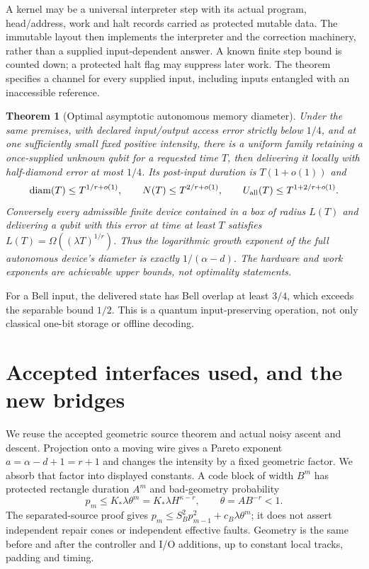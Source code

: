 \documentclass[11pt]{article}
\newtheorem{theorem}{Theorem}
\newcommand{\diam}{\operatorname{diam}}
\begin{document}
A kernel may be a universal interpreter step with its actual program,
head/address, work and halt records carried as protected mutable data.
The immutable layout then implements the interpreter and the correction
machinery, rather than a supplied input-dependent answer. A known finite
step bound is counted down; a protected halt flag may suppress later work.
The theorem specifies a channel for every supplied input, including
inputs entangled with an inaccessible reference.

\begin{theorem}[Optimal asymptotic autonomous memory diameter]\label{thm:diam}
Under the same premises, with declared input/output access error strictly
below $1/4$, and at one sufficiently small fixed positive intensity,
there is a uniform family retaining a once-supplied unknown
qubit for a requested time $T$, then delivering it locally with half-diamond
error at most $1/4$. Its post-input duration is $T(1+o(1))$ and
\[
 \diam(T)\leq T^{1/r+o(1)},\qquad
 N(T)\leq T^{2/r+o(1)},\qquad
 U_{\rm all}(T)\leq T^{1+2/r+o(1)}.
\]
Conversely every admissible finite device contained in a box of radius
$L(T)$ and delivering a qubit with this error at time at least $T$ satisfies
$L(T)=\Omega((\lambda T)^{1/r})$.
Thus the logarithmic growth exponent of the full autonomous device's
diameter is exactly $1/(\alpha-d)$. The hardware and work exponents are
achievable upper bounds, not optimality statements.
\end{theorem}

For a Bell input, the delivered state has Bell overlap at least $3/4$,
which exceeds the separable bound $1/2$. This is a quantum input-preserving
operation, not only classical one-bit storage or offline decoding.

\section{Accepted interfaces used, and the new bridges}

We reuse the accepted geometric source theorem and actual noisy ascent
and descent. Projection onto a moving wire gives a Pareto exponent
$a=\alpha-d+1=r+1$ and changes the intensity by a fixed geometric factor.
We absorb that factor into displayed constants. A code block of width
$B^m$ has protected rectangle duration $A^m$ and bad-geometry probability
\begin{equation}\label{eq:pm}
 p_m\leq K_*\lambda\theta^m
       =K_*\lambda H^{\kappa-r},
 \qquad \theta=AB^{-r}<1.
\end{equation}
The separated-source proof gives
$p_m\leq S_B^2p_{m-1}^2+c_B\lambda\theta^m$; it does not assert
independent repair cones or independent effective faults. Geometry is the
same before and after the controller and I/O additions, up to constant
local tracks, padding and timing.
\end{document}
